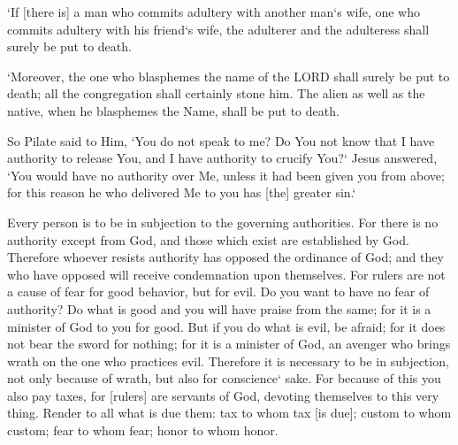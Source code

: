 \vspace{2\baselineskip}

\begin{scripture}[Leviticus 20:10]
    `If [there is] a man who commits adultery with another man`s wife, one who commits adultery with his friend`s wife, the adulterer and the adulteress shall surely be put to death.
\end{scripture}

\vspace{2\baselineskip}

\begin{scripture}[Leviticus 24:16]
    `Moreover, the one who blasphemes the name of the LORD shall surely be put to death; all the congregation shall certainly stone him. The alien as well as the native, when he blasphemes the Name, shall be put to death.
\end{scripture}

\vspace{2\baselineskip}

\begin{scripture}[John 19:10-11]
    So Pilate said to Him, `You do not speak to me? Do You not know that I have authority to release You, and I have authority to crucify You?`
    Jesus answered, `You would have no authority over Me, unless it had been given you from above; for this reason he who delivered Me to you has [the] greater sin.`
\end{scripture}

\vspace{2\baselineskip}

\begin{scripture}[Romans 13:1-7]
    Every person is to be in subjection to the governing authorities. For there is no authority except from God, and those which exist are established by God.
    Therefore whoever resists authority has opposed the ordinance of God; and they who have opposed will receive condemnation upon themselves.
    For rulers are not a cause of fear for good behavior, but for evil. Do you want to have no fear of authority? Do what is good and you will have praise from the same;
    for it is a minister of God to you for good. But if you do what is evil, be afraid; for it does not bear the sword for nothing; for it is a minister of God, an avenger who brings wrath on the one who practices evil.
    Therefore it is necessary to be in subjection, not only because of wrath, but also for conscience` sake.
    For because of this you also pay taxes, for [rulers] are servants of God, devoting themselves to this very thing.
    Render to all what is due them: tax to whom tax [is due]; custom to whom custom; fear to whom fear; honor to whom honor.
\end{scripture}


\vspace{6\baselineskip}
